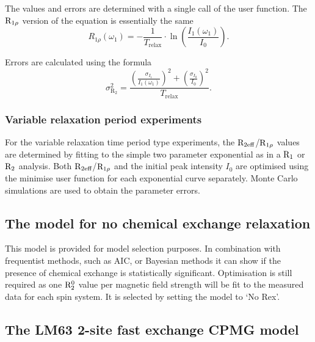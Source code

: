 The values and errors are determined with a single call of the  user function.  The $\mathrm{R}_{1\rho}$ version of the equation is essentially the same
\begin{equation}
    R_{1\rho}(\omega_1) = - \frac{1}{T_\textrm{relax}} \cdot \ln \left( \frac{I_1(\omega_1)}{I_0} \right) .
\end{equation}

Errors are calculated using the formula
\begin{equation}
    \sigma_{\textrm{R}_2}^2 = \frac{\left( \frac{\sigma_{I_1}}{I_1(\omega_1)} \right)^2  +  \left( \frac{\sigma_{I_0}}{I_0} \right)^2 }{T_\textrm{relax}} .
\end{equation}


\subsubsection{Variable relaxation period experiments}

For the variable relaxation time period type experiments, the $\mathrm{R}_{2\textrm{eff}}$/$\mathrm{R}_{1\rho}$ values are determined by fitting to the simple two parameter exponential as in a $\mathrm{R}_1$ or $\mathrm{R}_2$ analysis.  Both $\mathrm{R}_{2\textrm{eff}}$/$\mathrm{R}_{1\rho}$ and the initial peak intensity $I_0$ are optimised using the minimise user function for each exponential curve separately.  Monte Carlo simulations are used to obtain the parameter errors.




\subsection{The model for no chemical exchange relaxation}

This model is provided for model selection purposes.  In combination with frequentist methods, such as AIC, or Bayesian methods it can show if the presence of chemical exchange is statistically significant.  Optimisation is still required as one $\mathrm{R}_2^0$ value per magnetic field strength will be fit to the measured data for each spin system.  It is selected by setting the model to `No Rex'.




\subsection{The LM63 2-site fast exchange CPMG model}

